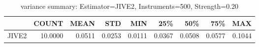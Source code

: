 \begin{table}[ht]
\centering
\caption{variance summary: Estimator=JIVE2, Instruments=500, Strength=0.20}
\begin{tabular}{lrrrrrrrr}
\toprule
 & COUNT & MEAN & STD & MIN & 25\% & 50\% & 75\% & MAX \\
\midrule
JIVE2 & 10.0000 & 0.0511 & 0.0253 & 0.0111 & 0.0367 & 0.0508 & 0.0577 & 0.1044 \\
\bottomrule
\end{tabular}
\end{table}
